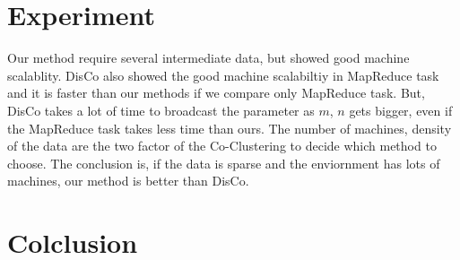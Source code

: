 \documentclass[10pt]{article}
\begin{document}
	
	\section{Experiment~}
		Our method require several intermediate data, but showed good machine scalablity. DisCo also showed the good machine scalabiltiy in MapReduce task and it is faster than our methods if we compare only MapReduce task. But, DisCo takes a lot of time to broadcast the parameter as $m$, $n$ gets bigger, even if the MapReduce task takes less time than ours. The number of machines, density of the data are the two factor of the Co-Clustering to decide which method to choose. The conclusion is, if the data is sparse and the enviornment has lots of machines, our method is better than DisCo.
		
	\section{Colclusion~}
\end{document}
